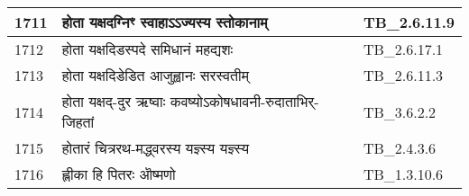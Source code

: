 \documentclass[17pt]{extarticle}
\begin{document}
\begin{longtable}{||p{0.4in}||p{4.9in}||p{0.9in}||}
    1711 & होता यक्षदग्निꣳ स्वाहाऽऽज्यस्य स्तोकानाम् & TB\_2.6.11.9       \\
    
    \hline
        
    1712 & होता यक्षदिडस्पदे समिधानं महद्यशः & TB\_2.6.17.1       \\
    
    \hline
        
    1713 & होता यक्षदिडेडित आजुह्वानः सरस्वतीम् & TB\_2.6.11.3       \\
    
    \hline
        
    1714 & होता यक्षद्{-}दुर ऋष्वाः कवष्योऽकोषधावनी{-}रुदाताभिर्{-}जिहतां & TB\_3.6.2.2       \\
    
    \hline
        
    1715 & होतारं चित्ररथ{-}मद्ध्वरस्य यज्ञ्स्य यज्ञ्स्य & TB\_2.4.3.6       \\
    
    \hline
        
    1716 & ह्लीका हि पितरः ऒष्मणो & TB\_1.3.10.6       \\
    
    \hline
        \bottomrule
  \end{longtable}
  
\end{document}
